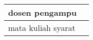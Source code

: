 \documentclass[12pt, landscape]{simrep} %
\begin{document}
\begin{longtable}{*{8}{P{1.15in}}@{}}
	dosen pengampu                             &                                                                                                                                                                  \\
                                               \midrule
	mata kuliah syarat                         &                                                                                                                                                                      \\
	\bottomrule
\end{longtable}










\end{document}
